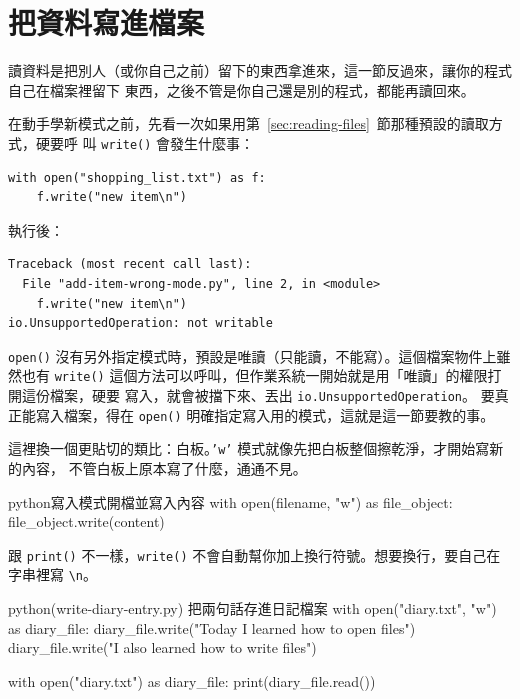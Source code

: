 \section{把資料寫進檔案}
\label{sec:writing-files}

讀資料是把別人（或你自己之前）留下的東西拿進來，這一節反過來，讓你的程式自己在檔案裡留下
東西，之後不管是你自己還是別的程式，都能再讀回來。

在動手學新模式之前，先看一次如果用第~\ref{sec:reading-files}~節那種預設的讀取方式，硬要呼
叫 \texttt{write()} 會發生什麼事：

\begin{verbatim}
with open("shopping_list.txt") as f:
    f.write("new item\n")
\end{verbatim}

執行後：

\begin{verbatim}
Traceback (most recent call last):
  File "add-item-wrong-mode.py", line 2, in <module>
    f.write("new item\n")
io.UnsupportedOperation: not writable
\end{verbatim}

\texttt{open()} 沒有另外指定模式時，預設是唯讀（只能讀，不能寫）。這個檔案物件上雖然也有
\texttt{write()} 這個方法可以呼叫，但作業系統一開始就是用「唯讀」的權限打開這份檔案，硬要
寫入，就會被擋下來、丟出 \texttt{io.UnsupportedOperation}。
要真正能寫入檔案，得在
\texttt{open()} 明確指定寫入用的模式，這就是這一節要教的事。

這裡換一個更貼切的類比：白板。\texttt{'w'} 模式就像先把白板整個擦乾淨，才開始寫新的內容，
不管白板上原本寫了什麼，通通不見。

\begin{code}{python}{寫入模式開檔並寫入內容}
with open(filename, "w") as file_object:
    file_object.write(content)
\end{code}

跟 \texttt{print()} 不一樣，\texttt{write()} 不會自動幫你加上換行符號。想要換行，要自己在
字串裡寫 \texttt{\textbackslash n}。

\begin{example}{python}{(write-diary-entry.py) 把兩句話存進日記檔案}
with open("diary.txt", "w") as diary_file:
    diary_file.write("Today I learned how to open files")
    diary_file.write("I also learned how to write files")

with open("diary.txt") as diary_file:
    print(diary_file.read())
\end{example}

